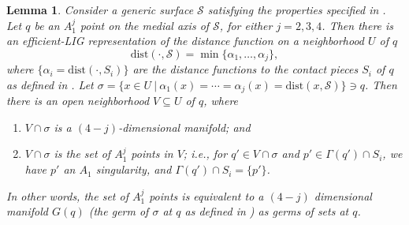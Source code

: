\documentclass[11pt]{article}
\newcommand{\dist}{\mathrm{dist}}
\newcommand{\Surf}{\mathcal{S}}
\theoremstyle{plain}
\newtheorem{lem}{Lemma}
\theoremstyle{definition}
\theoremstyle{remark}
\begin{document}
\begin{lem} \label{lem:A1_manifolds} Consider a generic surface $\Surf$ satisfying the properties specified in . Let $q$ be an $A_1^j$ point on the medial axis of $\Surf$, for either $j = 2,3,4$.  Then there is an efficient-LIG representation of the distance function on a neighborhood $U$ of $q$
$$ 
\dist(\cdot, \Surf) = \min \{ \alpha_1, \ldots, \alpha_j\},
$$
where $\{\alpha_i = \dist(\cdot, S_i) \}$ are the distance functions to the contact pieces $S_i$ of $q$ as defined in . Let $\sigma = \{x \in U \ | \ \alpha_1(x) = \cdots = \alpha_j(x) = \dist(x, \Surf)\} \ni q$.
Then there is an open neighborhood $V \subseteq U$ of $q$, where 
\begin{enumerate}
	\item $V \cap \sigma $ is a $(4-j)$-dimensional manifold; and
	\item $V \cap \sigma $ is the set of $A_1^j$ points in $V$; i.e., for $q'\in V \cap \sigma$  and $p' \in \Gamma(q')\cap S_i$, we have $p'$ an $A_1$ singularity, and $\Gamma(q')\cap S_i = \{p'\}$.
\end{enumerate}
In other words, the set of $A_1^j$ points is equivalent to a $(4-j)$ dimensional manifold $G(q)$ (the germ of $\sigma$  at $q$ as defined in ) as germs of sets at $q$.
\end{lem}
\end{document}
